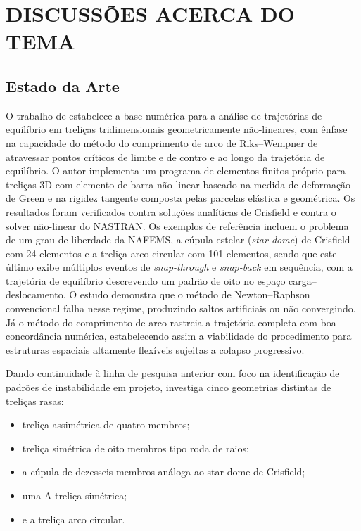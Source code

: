 


\section{DISCUSSÕES ACERCA DO TEMA}
\label{sec:discussões}

\subsection{Estado da Arte}

O trabalho de \citet{hrinda_nguyen2008} estabelece a base numérica para a análise de trajetórias de equilíbrio em treliças tridimensionais geometricamente não-lineares, com ênfase na capacidade do método do comprimento de arco de Riks--Wempner de atravessar pontos críticos de limite e de contro e ao longo da trajetória de equilíbrio. O autor implementa um programa de elementos finitos próprio para treliças 3D com elemento de barra não-linear baseado na medida de deformação de Green e na rigidez tangente composta pelas parcelas elástica e geométrica. Os resultados foram verificados contra soluções analíticas de Crisfield e contra o solver não-linear do NASTRAN. Os exemplos de referência incluem o problema de um grau de liberdade da NAFEMS, a cúpula estelar (\textit{star dome}) de Crisfield com 24 elementos e a treliça arco circular com 101 elementos, sendo que este último exibe múltiplos eventos de \textit{snap-through} e \textit{snap-back} em sequência, com a trajetória de equilíbrio descrevendo um padrão de oito no espaço carga--deslocamento. O estudo demonstra que o método de Newton--Raphson convencional falha nesse regime, produzindo saltos artificiais ou não convergindo. Já o método do comprimento de arco rastreia a trajetória completa com boa concordância numérica, estabelecendo assim a viabilidade do procedimento para estruturas espaciais altamente flexíveis sujeitas a colapso progressivo.

Dando continuidade à linha de pesquisa anterior com foco na identificação de padrões de instabilidade em projeto, \citet{Hrinda2010} investiga cinco geometrias distintas de treliças rasas: 

\begin{itemize}
    \item treliça assimétrica de quatro membros;
    \item treliça simétrica de oito membros tipo roda de raios;
    \item a cúpula de dezesseis membros análoga ao star dome de Crisfield;
    \item uma A-treliça simétrica;
    \item e a treliça arco circular.
\end{itemize}

